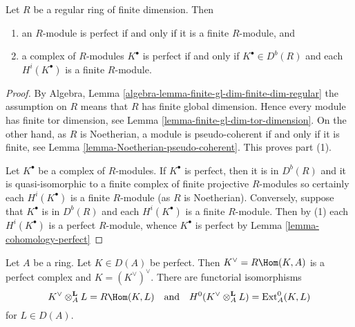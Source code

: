 \begin{lemma}
\label{lemma-regular-perfect}
Let $R$ be a regular ring of finite dimension. Then
\begin{enumerate}
\item an $R$-module is perfect if and only if it is a finite $R$-module, and
\item a complex of $R$-modules $K^\bullet$ is perfect if and only
if $K^\bullet \in D^b(R)$ and each $H^i(K^\bullet)$ is a finite $R$-module.
\end{enumerate}
\end{lemma}

\begin{proof}
By
Algebra, Lemma \ref{algebra-lemma-finite-gl-dim-finite-dim-regular}
the assumption on $R$ means that $R$ has finite global dimension.
Hence every module has finite tor dimension, see
Lemma \ref{lemma-finite-gl-dim-tor-dimension}.
On the other hand, as $R$ is Noetherian, a module is pseudo-coherent
if and only if it is finite, see
Lemma \ref{lemma-Noetherian-pseudo-coherent}.
This proves part (1).

\medskip\noindent
Let $K^\bullet$ be a complex of $R$-modules.
If $K^\bullet$ is perfect, then it is in $D^b(R)$ and it is
quasi-isomorphic to a finite complex of finite projective $R$-modules
so certainly each $H^i(K^\bullet)$ is a finite $R$-module (as $R$ is
Noetherian). Conversely, suppose that $K^\bullet$ is in $D^b(R)$
and each $H^i(K^\bullet)$ is a finite $R$-module. Then by (1) each
$H^i(K^\bullet)$ is a perfect $R$-module, whence $K^\bullet$ is
perfect by
Lemma \ref{lemma-cohomology-perfect}
\end{proof}

\begin{lemma}
\label{lemma-dual-perfect-complex}
Let $A$ be a ring. Let $K \in D(A)$ be perfect. Then $K^\vee = R\Hom(K, A)$
is a perfect complex and $K = (K^\vee)^\vee$. There are functorial
isomorphisms
$$
K^\vee \otimes_A^\mathbf{L} L = R\Hom(K, L)
\quad\text{and}\quad
H^0(K^\vee \otimes_A^\mathbf{L} L) = \text{Ext}_A^0(K, L)
$$
for $L \in D(A)$.
\end{lemma}

